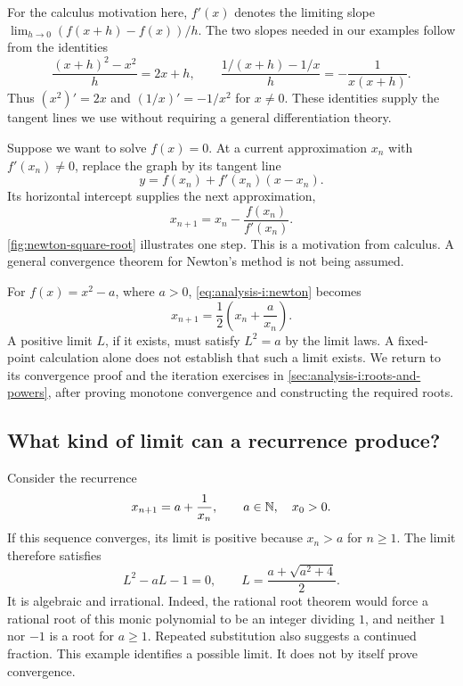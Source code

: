 For the calculus motivation here, $f'(x)$ denotes the limiting slope
$\lim_{h\to0}(f(x+h)-f(x))/h$. The two slopes needed in our examples
follow from the identities
\[
  \frac{(x+h)^2-x^2}{h}=2x+h,\qquad
  \frac{1/(x+h)-1/x}{h}=-\frac1{x(x+h)}.
\]
Thus $(x^2)'=2x$ and $(1/x)'=-1/x^2$ for $x\ne0$.
These identities supply the tangent lines we use without requiring a
general differentiation theory.

Suppose we want to solve $f(x)=0$. At a current approximation $x_n$ with
$f'(x_n)\ne0$, replace the graph by its tangent line
\[
  y=f(x_n)+f'(x_n)(x-x_n).
\]
Its horizontal intercept supplies the next approximation,
\begin{equation}
  x_{n+1}=x_n-\frac{f(x_n)}{f'(x_n)}.
  \label{eq:analysis-i:newton}
\end{equation}
\autoref{fig:newton-square-root} illustrates one step. This is a
motivation from calculus. A general convergence theorem for Newton's
method is not being assumed.
\begin{marginfigure}
  \centering
  
  \caption[One Newton step for a square root.]{For $f(x)=x^2-2$, the tangent at $x_0=2$ meets the axis at
    $x_1=3/2$. The parabola is shown for $x\geq0$.}
  \label{fig:newton-square-root}
\end{marginfigure}

For $f(x)=x^2-a$, where $a>0$, \autoref{eq:analysis-i:newton} becomes
\[
  x_{n+1}=\frac12\left(x_n+\frac{a}{x_n}\right).
\]
A positive limit $L$, if it exists, must satisfy $L^2=a$ by the limit
laws. A fixed-point calculation alone does not establish that such a
limit exists. We return to its convergence proof and the iteration
exercises in \autoref{sec:analysis-i:roots-and-powers}, after proving
monotone convergence and constructing the required roots.

\subsection{What kind of limit can a recurrence produce?}
Consider the recurrence
\[
  x_{n+1}=a+\frac{1}{x_n},\qquad a\in\mathbb{N},\quad x_0>0.
\]
If this sequence converges, its limit is positive because $x_n>a$ for
$n\geq1$. The limit therefore satisfies
\[
  L^2-aL-1=0,\qquad L=\frac{a+\sqrt{a^2+4}}{2}.
\]
It is algebraic and irrational. Indeed, the rational root theorem would
force a rational root of this monic polynomial to be an integer dividing
$1$, and neither $1$ nor $-1$ is a root for $a\geq1$.
Repeated substitution also suggests a continued fraction. This example
identifies a possible limit. It does not by itself prove convergence.

